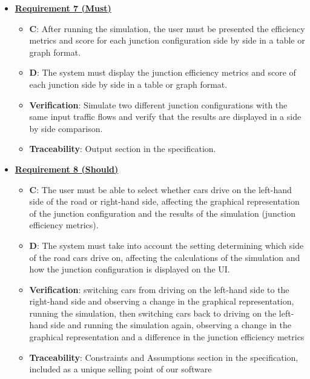 \documentclass{article}
\begin{document}
\begin{itemize}
    \item \textbf{\underline{Requirement 7 (Must)}}
    \begin{itemize}
        \item \textbf{C}: After running the simulation, the user must be presented the efficiency metrics 
        and score for each junction configuration side by side in a table or graph format.
        \item \textbf{D}: The system must display the junction efficiency metrics and score of each junction 
        side by side in a table or graph format.
        \item \textbf{Verification}: Simulate two different junction configurations with the same 
            input traffic flows and verify that the results are displayed in a side by side comparison.
        \item\textbf{Traceability}: Output section in the specification.
    \end{itemize}

    \item \textbf{\underline{Requirement 8 (Should)}}
    \begin{itemize}
        \item \textbf{C}: The user must be able to select whether cars drive on the left-hand side of 
            the road or right-hand side, affecting the graphical representation of the junction
            configuration and the results of the simulation (junction efficiency metrics).
        \item \textbf{D}: The system must take into account the setting determining which side of
            the road cars drive on, affecting the calculations of the simulation and how 
            the junction configuration is displayed on the UI.
        \item \textbf{Verification}: switching cars from driving on the left-hand side to the 
            right-hand side and observing a change in the graphical representation, running 
            the simulation, then switching cars back to driving on the left-hand side and 
            running the simulation again, observing a change in the graphical representation 
            and a difference in the junction efficiency metrics
        \item\textbf{Traceability}: Constraints and Assumptions section in the specification, included 
            as a unique selling point of our software
    \end{itemize}


\end{itemize}
\end{document}
